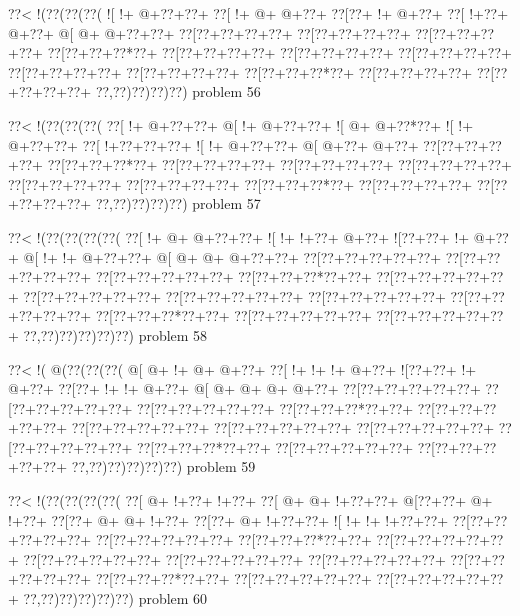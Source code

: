 \vbox{\vbox{\goo
\0??<\- !(\0??(\0??(\0??(
\- ![\- !+\- @+\0??+\0??+
\0??[\- !+\- @+\- @+\0??+
\0??[\0??+\- !+\- @+\0??+
\0??[\- !+\0??+\- @+\0??+
\- @[\- @+\- @+\0??+\0??+
\0??[\0??+\0??+\0??+\0??+
\0??[\0??+\0??+\0??+\0??+
\0??[\0??+\0??+\0??+\0??+
\0??[\0??+\0??+\0??*\0??+
\0??[\0??+\0??+\0??+\0??+
\0??[\0??+\0??+\0??+\0??+
\0??[\0??+\0??+\0??+\0??+
\0??[\0??+\0??+\0??+\0??+
\0??[\0??+\0??+\0??+\0??+
\0??[\0??+\0??+\0??*\0??+
\0??[\0??+\0??+\0??+\0??+
\0??[\0??+\0??+\0??+\0??+
\0??,\0??)\0??)\0??)\0??)
}
\hfil problem 56\hfil\break
}

\vbox{\vbox{\goo
\0??<\- !(\0??(\0??(\0??(
\0??[\- !+\- @+\0??+\0??+
\- @[\- !+\- @+\0??+\0??+
\- ![\- @+\- @+\0??*\0??+
\- ![\- !+\- @+\0??+\0??+
\0??[\- !+\0??+\0??+\0??+
\- ![\- !+\- @+\0??+\0??+
\- @[\- @+\0??+\- @+\0??+
\0??[\0??+\0??+\0??+\0??+
\0??[\0??+\0??+\0??*\0??+
\0??[\0??+\0??+\0??+\0??+
\0??[\0??+\0??+\0??+\0??+
\0??[\0??+\0??+\0??+\0??+
\0??[\0??+\0??+\0??+\0??+
\0??[\0??+\0??+\0??+\0??+
\0??[\0??+\0??+\0??*\0??+
\0??[\0??+\0??+\0??+\0??+
\0??[\0??+\0??+\0??+\0??+
\0??,\0??)\0??)\0??)\0??)
}
\hfil problem 57\hfil\break
}

\vbox{\vbox{\goo
\0??<\- !(\0??(\0??(\0??(\0??(
\0??[\- !+\- @+\- @+\0??+\0??+
\- ![\- !+\- !+\0??+\- @+\0??+
\- ![\0??+\0??+\- !+\- @+\0??+
\- @[\- !+\- !+\- @+\0??+\0??+
\- @[\- @+\- @+\- @+\0??+\0??+
\0??[\0??+\0??+\0??+\0??+\0??+
\0??[\0??+\0??+\0??+\0??+\0??+
\0??[\0??+\0??+\0??+\0??+\0??+
\0??[\0??+\0??+\0??*\0??+\0??+
\0??[\0??+\0??+\0??+\0??+\0??+
\0??[\0??+\0??+\0??+\0??+\0??+
\0??[\0??+\0??+\0??+\0??+\0??+
\0??[\0??+\0??+\0??+\0??+\0??+
\0??[\0??+\0??+\0??+\0??+\0??+
\0??[\0??+\0??+\0??*\0??+\0??+
\0??[\0??+\0??+\0??+\0??+\0??+
\0??[\0??+\0??+\0??+\0??+\0??+
\0??,\0??)\0??)\0??)\0??)\0??)
}
\hfil problem 58\hfil\break
}

\vbox{\vbox{\goo
\0??<\- !(\- @(\0??(\0??(\0??(
\- @[\- @+\- !+\- @+\- @+\0??+
\0??[\- !+\- !+\- !+\- @+\0??+
\- ![\0??+\0??+\- !+\- @+\0??+
\0??[\0??+\- !+\- !+\- @+\0??+
\- @[\- @+\- @+\- @+\- @+\0??+
\0??[\0??+\0??+\0??+\0??+\0??+
\0??[\0??+\0??+\0??+\0??+\0??+
\0??[\0??+\0??+\0??+\0??+\0??+
\0??[\0??+\0??+\0??*\0??+\0??+
\0??[\0??+\0??+\0??+\0??+\0??+
\0??[\0??+\0??+\0??+\0??+\0??+
\0??[\0??+\0??+\0??+\0??+\0??+
\0??[\0??+\0??+\0??+\0??+\0??+
\0??[\0??+\0??+\0??+\0??+\0??+
\0??[\0??+\0??+\0??*\0??+\0??+
\0??[\0??+\0??+\0??+\0??+\0??+
\0??[\0??+\0??+\0??+\0??+\0??+
\0??,\0??)\0??)\0??)\0??)\0??)
}
\hfil problem 59\hfil\break
}

\vbox{\vbox{\goo
\0??<\- !(\0??(\0??(\0??(\0??(
\0??[\- @+\- !+\0??+\- !+\0??+
\0??[\- @+\- @+\- !+\0??+\0??+
\- @[\0??+\0??+\- @+\- !+\0??+
\0??[\0??+\- @+\- @+\- !+\0??+
\0??[\0??+\- @+\- !+\0??+\0??+
\- ![\- !+\- !+\- !+\0??+\0??+
\0??[\0??+\0??+\0??+\0??+\0??+
\0??[\0??+\0??+\0??+\0??+\0??+
\0??[\0??+\0??+\0??*\0??+\0??+
\0??[\0??+\0??+\0??+\0??+\0??+
\0??[\0??+\0??+\0??+\0??+\0??+
\0??[\0??+\0??+\0??+\0??+\0??+
\0??[\0??+\0??+\0??+\0??+\0??+
\0??[\0??+\0??+\0??+\0??+\0??+
\0??[\0??+\0??+\0??*\0??+\0??+
\0??[\0??+\0??+\0??+\0??+\0??+
\0??[\0??+\0??+\0??+\0??+\0??+
\0??,\0??)\0??)\0??)\0??)\0??)
}
\hfil problem 60\hfil\break
}

